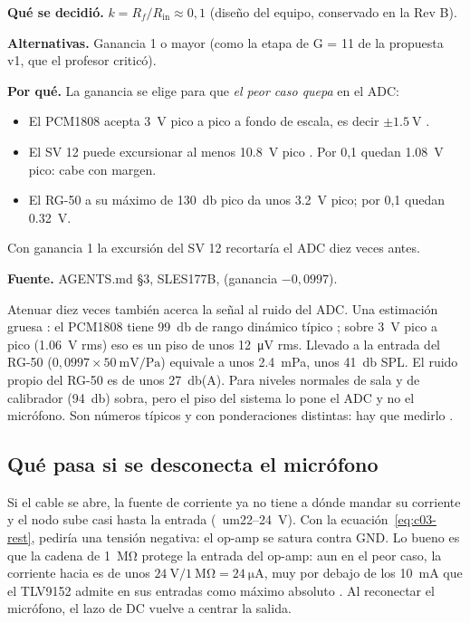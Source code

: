 \begin{decision}
\textbf{Qué se decidió.} $k = R_f/R_{\mathrm{in}} \approx 0{,}1$ (diseño del equipo, conservado en la Rev B).

\textbf{Alternativas.} Ganancia 1 o mayor (como la etapa de G = 11 de la propuesta v1, que el profesor criticó).

\textbf{Por qué.} La ganancia se elige para que \emph{el peor caso quepa} en el ADC:
\begin{itemize}
  \item El PCM1808 acepta \SI{3}{\volt} pico a pico a fondo de escala, es decir $\pm\SI{1.5}{\volt}$
        .
  \item El SV 12 puede excursionar al menos \SI{10.8}{\volt} pico . Por 0,1 quedan
        \SI{1.08}{\volt} pico: cabe con margen.
  \item El RG-50 a su máximo de \SI{130}{\decibel} pico da unos \SI{3.2}{\volt} pico; por 0,1 quedan
        \SI{0.32}{\volt}.
\end{itemize}
Con ganancia 1 la excursión del SV 12 recortaría el ADC diez veces antes.

\textbf{Fuente.} AGENTS.md §3, SLES177B,  (ganancia $-0{,}0997$).
\end{decision}

\begin{ojo}
Atenuar diez veces también acerca la señal al ruido del ADC. Una estimación gruesa \estimado: el PCM1808 tiene
\SI{99}{\decibel} de rango dinámico típico ; sobre \SI{3}{\volt} pico a pico
(\SI{1.06}{\volt} rms) eso es un piso de unos \SI{12}{\micro\volt} rms. Llevado a la entrada del RG-50
($0{,}0997\times\SI{50}{\milli\volt\per\pascal}$) equivale a unos \SI{2.4}{\milli\pascal}, unos \SI{41}{\decibel} SPL. El
ruido propio del RG-50 es de unos \SI{27}{\decibel}(A). Para niveles normales de sala y de calibrador (\SI{94}{\decibel})
sobra, pero el piso del sistema lo pone el ADC y no el micrófono. Son números típicos y con ponderaciones distintas: hay
que medirlo \medir.
\end{ojo}

\subsection{Qué pasa si se desconecta el micrófono}

Si el cable se abre, la fuente de corriente ya no tiene a dónde mandar su corriente y el nodo  sube casi
hasta la entrada (\
um{22}–\SI{24}{\volt}). Con la ecuación~\eqref{eq:c03-rest},  pediría una tensión
negativa: el op-amp se satura contra GND. Lo bueno es que la cadena de \SI{1}{\mega\ohm} protege la entrada del
op-amp: aun en el peor caso, la corriente hacia \net{SUM} es de unos $\SI{24}{\volt}/\SI{1}{\mega\ohm} =
\SI{24}{\micro\ampere}$, muy por debajo de los \SI{10}{\milli\ampere} que el TLV9152 admite en sus entradas como máximo
absoluto \doc{SBOS986E p.9}. Al reconectar el micrófono, el lazo de DC vuelve a centrar la salida.

